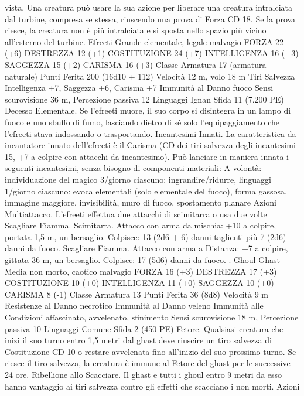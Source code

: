 \begin{multicols}{2}
vista.
Una creatura può usare la sua azione per liberare una creatura
intralciata dal turbine, compresa se stessa, riuscendo una prova di
Forza CD 18. Se la prova riesce, la creatura non è più intralciata
e si sposta nello spazio più vicino all’esterno del turbine.
Efreeti
Grande elementale, legale malvagio
FORZA 22 (+6)
DESTREZZA 12 (+1)
COSTITUZIONE 24 (+7)
INTELLIGENZA 16 (+3)
SAGGEZZA 15 (+2)
CARISMA 16 (+3)
Classe Armatura 17 (armatura naturale)
Punti Ferita 200 (16d10 + 112)
Velocità 12 m, volo 18 m
Tiri Salvezza Intelligenza +7, Saggezza +6, Carisma +7
Immunità al Danno fuoco
Sensi scurovisione 36 m, Percezione passiva 12
Linguaggi Ignan
Sfida 11 (7.200 PE)
Decesso Elementale. Se l’efreeti muore, il suo corpo si
disintegra in un lampo di fuoco e uno sbuffo di fumo, lasciando
dietro di sé solo l’equipaggiamento che l’efreeti stava indossando
o trasportando.
Incantesimi Innati. La caratteristica da incantatore innato
dell’efreeti è il Carisma (CD dei tiri salvezza degli incantesimi
15, +7 a colpire con attacchi da incantesimo). Può lanciare in
maniera innata i seguenti incantesimi, senza bisogno di
componenti materiali:
A volontà: individuazione del magico
3/giorno ciascuno: ingrandire/ridurre, linguaggi
1/giorno ciascuno: evoca elementali (solo elementale del fuoco),
forma gassosa, immagine maggiore, invisibilità, muro di fuoco,
spostamento planare
Azioni
Multiattacco. L’efreeti effettua due attacchi di scimitarra o usa
due volte Scagliare Fiamma.
Scimitarra. Attacco con arma da mischia: +10 a colpire, portata
1,5 m, un bersaglio.
Colpisce: 13 (2d6 + 6) danni taglienti più 7 (2d6) danni da fuoco.
Scagliare Fiamma. Attacco con arma a Distanza: +7 a colpire,
gittata 36 m, un bersaglio.
Colpisce: 17 (5d6) danni da fuoco.
.
Ghoul
Ghast
Media non morto, caotico malvagio
FORZA 16 (+3)
DESTREZZA 17 (+3)
COSTITUZIONE 10 (+0)
INTELLIGENZA 11 (+0)
SAGGEZZA 10 (+0)
CARISMA 8 (-1)
Classe Armatura 13
Punti Ferita 36 (8d8)
Velocità 9 m
Resistenze al Danno necrotico
Immunità al Danno veleno
Immunità alle Condizioni affascinato, avvelenato, sfinimento
Sensi scurovisione 18 m, Percezione passiva 10
Linguaggi Comune
Sfida 2 (450 PE)
Fetore. Qualsiasi creatura che inizi il suo turno entro 1,5 metri dal
ghast deve riuscire un tiro salvezza di Costituzione CD 10 o restare
avvelenata fino all’inizio del suo prossimo turno. Se riesce il tiro
salvezza, la creatura è immune al Fetore del ghast per le successive
24 ore.
Ribellione allo Scacciare. Il ghast e tutti i ghoul entro 9 metri da
esso hanno vantaggio ai tiri salvezza contro gli effetti che
scacciano i non morti.
Azioni

\end{multicols}
